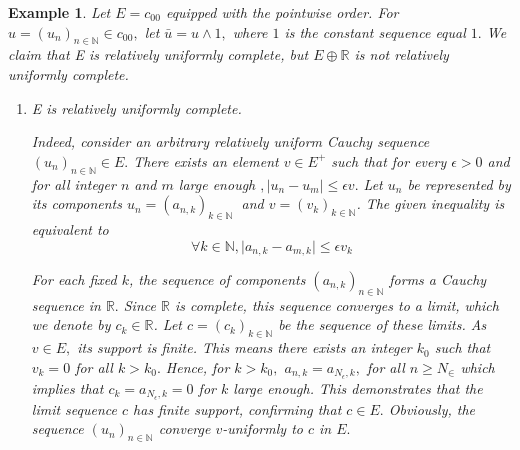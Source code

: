 \documentclass{birkau}
\numberwithin{equation}{section}
\theoremstyle{plain}
\newtheorem{example}[theorem]{Example}
\theoremstyle{definition}
\begin{document}
\begin{example}
	Let $E=c_{00}$ equipped with the pointwise order. For $u=\left( u_{n}\right)
	_{n\in 
		\mathbb{N}
	}\in c_{00},$ let $\bar{u}=u\wedge 1,$ where $1$ is the constant sequence
	equal $1.$ We claim that E is relatively uniformly complete, but $E\oplus 
	\mathbb{R}
	$ is not relatively uniformly complete.
	
	\begin{enumerate}
		\item E is relatively uniformly complete.
		
		Indeed,  consider an arbitrary relatively uniform Cauchy sequence $\left(
		u_{n}\right) _{n\in 
			\mathbb{N}
		}\in E.$  There exists an element $v\in E^{+}$ such that for every $\epsilon>0$ and for all integer $n$ and $m$ large enough 
		$
		,\mid u_{n}-u_{m}\mid \leq \epsilon v.$ Let $u_{n}$  be represented by its
		components $u_{n}=\left( a_{n,k}\right) _{k\in 
			\mathbb{N}
		}$ $\ $and $v=\left( v_{k}\right) _{k\in 
			\mathbb{N}
		}$.  The given inequality is equivalent to  
		\begin{equation*}
			\forall k\in 
			\mathbb{N}
			,\mid a_{n,k}-a_{m,k}\mid \leq \epsilon v_{k}
		\end{equation*}
		
		For each fixed $k$,  the sequence of components $\left( a_{n,k}\right) _{n\in 
			\mathbb{N}
		}$ forms a Cauchy sequence in $%
		\mathbb{R}
		.$ Since $%
		\mathbb{R}
		$ is complete, this sequence converges to a limit, which we denote by $%
		c_{k}\in 
		\mathbb{R}
		$. Let $c=\left( c_{k}\right) _{k\in 
			\mathbb{N}
		}$ be the sequence of these limits.  As $v\in E,$ its support is finite.  This
		means there exists an integer $k_{0}$ such that $v_{k}=0$ for all $k
		>k_{0}.$ Hence,  for $k>k_{0},$ $a_{n,k}=a_{N_{\epsilon},k},$ for all $n\geq N_{\in} $ which implies that $%
		c_{k}=a_{N_{\epsilon},k}=0$ for $k$ large enough. This demonstrates that the limit
		sequence $c$ has finite support, confirming that $c\in E.$ Obviously,  the
		sequence $\left( u_{n}\right) _{n\in 
			\mathbb{N}
		}$ converge $v$-uniformly to $c$ in $E.$
		

\end{enumerate}
\end{example}
\end{document}
